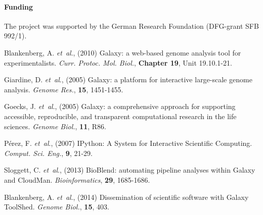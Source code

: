 \documentclass{bioinfo}
\begin{document}
\paragraph{Funding\textcolon} The project was supported by the German Research Foundation (DFG-grant SFB 992/1).


%
%
%
%
%
%
%
%


\begin{thebibliography}{}
Blankenberg, A. {\it et~al}., (2010) Galaxy: a web-based genome analysis tool for experimentalists. \textit{Curr. Protoc. Mol. Biol.},  {\bf Chapter 19}, Unit 19.10.1-21.

Giardine, D. {\it et~al}., (2005) Galaxy: a platform for interactive large-scale genome analysis. \textit{Genome Res.},  {\bf 15}, 1451-1455.

Goecks, J. {\it et~al}., (2005) Galaxy: a comprehensive approach for supporting accessible, reproducible, and transparent computational research in the life sciences. \textit{Genome Biol.},  {\bf 11}, R86.

P\'erez, F. {\it et~al}., (2007) IPython: A System for Interactive Scientific Computing. \textit{Comput. Sci. Eng.}, {\bf 9}, 21-29.

Sloggett, C. {\it et~al}., (2013) BioBlend: automating pipeline analyses within Galaxy and CloudMan. \textit{Bioinformatics}, {\bf 29}, 1685-1686.

Blankenberg, A. {\it et~al}., (2014) Dissemination of scientific software with Galaxy ToolShed. \textit{Genome Biol.}, {\bf 15}, 403.



\end{thebibliography}
\end{document}
